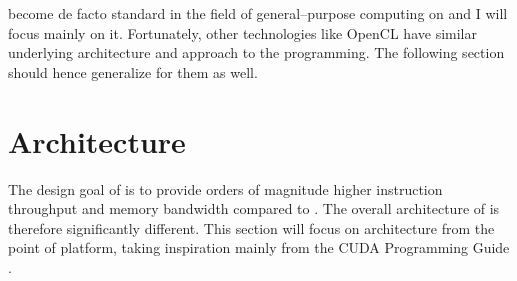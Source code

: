 \cuda become de facto standard in the field of general--purpose computing on \gpu and I will focus mainly on it. Fortunately, other technologies like OpenCL have similar underlying architecture and approach to the \gpu programming. The following section should hence generalize for them as well.




\section{Architecture}

The design goal of \gpu is to provide orders of magnitude higher instruction throughput and memory bandwidth compared to \cpuns. The overall architecture of \gpu is therefore significantly different. This section will focus on \gpu architecture from the point of \cuda platform, taking inspiration mainly from the CUDA Programming Guide \citep{CUDAguide}.

